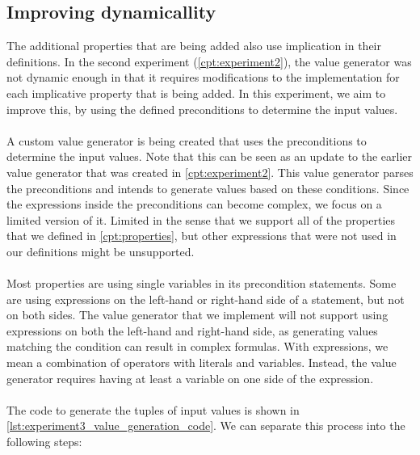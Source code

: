 \subsection{Improving dynamicallity}
The additional properties that are being added also use implication in their
definitions. In the second experiment (\autoref{cpt:experiment2}), the value
generator was not dynamic enough in that it requires modifications to the
implementation for each implicative property that is being added. In this
experiment, we aim to improve this, by using the defined preconditions to
determine the input values.\\
\\
A custom value generator is being created that uses the preconditions to determine the
input values. Note that this can be seen as an update to the earlier value generator that was
created in \autoref{cpt:experiment2}. This value generator parses the
preconditions and intends to generate values based on these conditions. Since
the expressions inside the preconditions can become complex, we focus on
a limited version of it. Limited in the sense that we support all of the properties that we defined in \autoref{cpt:properties}, but other expressions that were not used in our definitions might be unsupported.\\
\\
Most properties are using single variables in its precondition statements. Some
are using expressions on the left-hand or right-hand side of a statement, but
not on both sides. The value generator that we implement will not support using
expressions on both the left-hand and right-hand side, as generating values
matching the condition can result in complex formulas. With expressions, we mean a
combination of operators with literals and variables. Instead, the value generator requires having at least a variable on one side of the
expression.\\
\\
The code to generate the tuples of input values is shown in
\autoref{lst:experiment3_value_generation_code}. We can separate this process
into the following steps:
\def \valueGeneratorStepOne{Initialize value generation data (\hyperref[lst:experiment3_value_generation_code]{Line 7})}
\def \valueGeneratorStepTwo{Traverse and handle statements (\hyperref[lst:experiment3_value_generation_code]{Line 9-13})}
\def \valueGeneratorStepThree{Generate values for remaining, unassigned, variables (\hyperref[lst:experiment3_value_generation_code]{Line 15-18})}
\def \valueGeneratorStepFour{Add values to resulting list (\hyperref[lst:experiment3_value_generation_code]{Line 21})}
